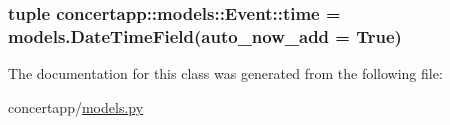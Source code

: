 \label{classconcertapp_1_1models_1_1_event_abf8022ffd48de8f0c571618d2f400a40}
\hypertarget{classconcertapp_1_1models_1_1_event_a7cb39acb85efc48124f09e01d2f44e72}{
\subsubsection[{time}]{\setlength{\rightskip}{0pt plus 5cm}tuple {\bf concertapp::models::Event::time} = models.DateTimeField(auto\_\-now\_\-add = True)}}
\label{classconcertapp_1_1models_1_1_event_a7cb39acb85efc48124f09e01d2f44e72}


The documentation for this class was generated from the following file:\begin{DoxyCompactItemize}
\item 
concertapp/\hyperlink{models_8py}{models.py}\end{DoxyCompactItemize}
